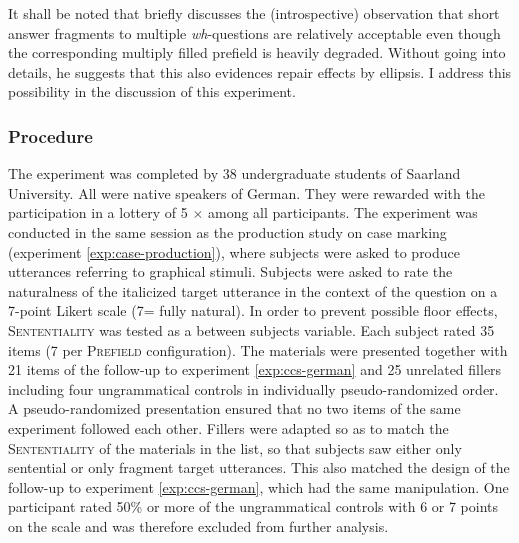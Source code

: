 It shall be noted that \citet[710--711]{merchant2004} briefly discusses the (introspective) observation that short answer fragments to multiple \textit{wh}-questions are relatively acceptable even though the corresponding multiply filled prefield is heavily degraded. Without going into details, he suggests that this also evidences repair effects by ellipsis. I address this possibility in the discussion of this experiment.

\subsubsection{Procedure}
The experiment was completed by 38 undergraduate students of Saarland University. All were native speakers of German. They were rewarded with the participation in a lottery of 5 $\times$  among all participants. The experiment was conducted in the same session as the production study on case marking (experiment \ref{exp:case-production}), where subjects were asked to produce utterances referring to graphical stimuli. Subjects were asked to rate the naturalness of the italicized target utterance in the context of the question on a 7-point Likert scale (7= fully natural). In order to prevent possible floor effects, \textsc{Sententiality} was tested as a between subjects variable. Each subject rated 35 items (7 per \textsc{Prefield} configuration). The materials were presented together with 21 items of the follow-up to experiment \ref{exp:ccs-german} and 25 unrelated fillers including four ungrammatical controls in individually pseudo-randomized order. A pseudo-randomized presentation ensured that no two items of the same experiment followed each other. Fillers were adapted so as to match the \textsc{Sententiality} of the materials in the list, so that subjects saw either only sentential or only fragment target utterances. This also matched the design of the follow-up to experiment \ref{exp:ccs-german}, which had the same manipulation. One participant rated 50\% or more of the ungrammatical controls with 6 or 7 points on the scale and was therefore excluded from further analysis. 

